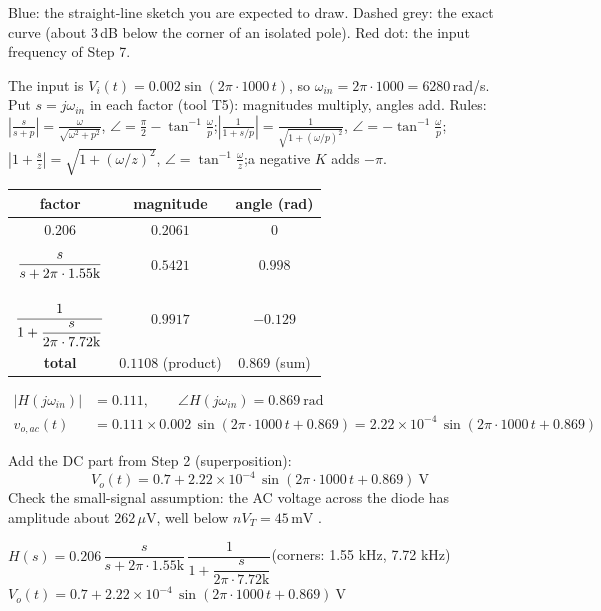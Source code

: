 \documentclass[11pt]{article}
\newcommand{\solstep}[2]{\par\medskip{\color{stepc}\textbf{Step #1 --- #2}}\par\nopagebreak}
\begin{document}
{\small Blue: the straight-line sketch you are expected to draw. Dashed grey: the exact curve (about 3\,dB below the corner of an isolated pole). Red dot: the input frequency of Step 7.}
\solstep{7}{Total output (DC + AC)}The input is $V_i(t) = 0.002\sin\left(2\pi\cdot 1000\,t\right)$, so $\omega_{in} = 2\pi\cdot 1000 = 6280$\,rad/s. Put $s=j\omega_{in}$ in each factor (tool T5): magnitudes multiply, angles add.
{\small Rules: $\left|\frac{s}{s+p}\right| = \frac{\omega}{\sqrt{\omega^2+p^2}}$, $\angle = \frac{\pi}{2}-\tan^{-1}\frac{\omega}{p}$;\quad $\left|\frac{1}{1+s/p}\right| = \frac{1}{\sqrt{1+(\omega/p)^2}}$, $\angle = -\tan^{-1}\frac{\omega}{p}$;\quad $\left|1+\frac{s}{z}\right| = \sqrt{1+(\omega/z)^2}$, $\angle = \tan^{-1}\frac{\omega}{z}$;\quad a negative $K$ adds $-\pi$.}
\begin{center}\renewcommand{\arraystretch}{1.35}
\begin{tabular}{ccc}
\toprule
factor & magnitude & angle (rad) \\
\midrule
$0.206$ & $0.2061$ & $0$ \\
$\rule[-1.1em]{0pt}{2.8em}\dfrac{s}{s+2\pi\cdot 1.55\mathrm{k}}$ & $0.5421$ & $0.998$ \\
$\rule[-1.7em]{0pt}{4em}\dfrac{1}{1+\dfrac{s}{2\pi\cdot 7.72\mathrm{k}}}$ & $0.9917$ & $-0.129$ \\
\textbf{total} & $\mathbf{0.1108}$ (product) & $\mathbf{0.869}$ (sum) \\
\bottomrule
\end{tabular}\end{center}

\begin{align*}
|H(j\omega_{in})| &= 0.111, \qquad \angle H(j\omega_{in}) = 0.869\ \mathrm{rad} \\
v_{o,ac}(t) &= 0.111\times 0.002\,\sin\left(2\pi\cdot 1000\,t + 0.869\right) = 2.22\times 10^{-4}\,\sin\left(2\pi\cdot 1000\,t + 0.869\right)
\end{align*}

Add the DC part from Step 2 (superposition):
\[
\boxed{V_o(t) = 0.7 + 2.22\times 10^{-4}\,\sin\left(2\pi\cdot 1000\,t + 0.869\right)\ \mathrm{V}}
\]
 Check the small-signal assumption: the AC voltage across the diode has amplitude about $262\,\mu \mathrm{V}$, well below $nV_T = 45\,\mathrm{m}\mathrm{V}$ \checkmark.
\begin{ansbox}
$H(s) = 0.206\,\dfrac{s}{s+2\pi\cdot 1.55\mathrm{k}}\,\dfrac{1}{1+\dfrac{s}{2\pi\cdot 7.72\mathrm{k}}}$\quad (corners: 1.55 kHz, 7.72 kHz)\\[4pt]
$V_o(t) = 0.7 + 2.22\times 10^{-4}\,\sin\left(2\pi\cdot 1000\,t + 0.869\right)\ \mathrm{V}$
\end{ansbox}
\end{document}
